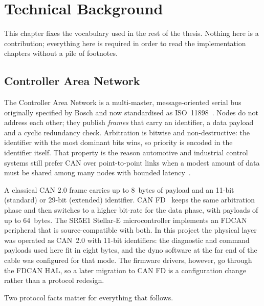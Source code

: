 \chapter{Technical Background}
\label{ch:bg}

This chapter fixes the vocabulary used in the rest of the thesis. Nothing
here is a contribution; everything here is required in order to read the
implementation chapters without a pile of footnotes.

\section{Controller Area Network}
\label{sec:can}

The Controller Area Network is a multi-master, message-oriented serial bus
originally specified by Bosch and now standardised as
ISO~11898~\cite{bosch1991can,iso11898,voss2008can}. Nodes do not address
each other; they publish \emph{frames} that carry an identifier, a data
payload and a cyclic redundancy check. Arbitration is bitwise and
non-destructive: the identifier with the most dominant bits wins, so
priority is encoded in the identifier itself. That property is the reason
automotive and industrial control systems still prefer CAN over
point-to-point links when a modest amount of data must be shared among many
nodes with bounded latency~\cite{navet2005can}.

A classical CAN 2.0 frame carries up to 8~bytes of payload and an 11-bit
(standard) or 29-bit (extended) identifier. CAN FD~\cite{iso11898fd} keeps
the same arbitration phase and then switches to a higher bit-rate for the
data phase, with payloads of up to 64~bytes. The SR5E1 Stellar-E
microcontroller implements an FDCAN peripheral that is source-compatible
with both. In this project the physical layer was operated as CAN~2.0 with
11-bit identifiers: the diagnostic and command payloads used here fit in
eight bytes, and the dyno software at the far end of the cable was
configured for that mode. The firmware drivers, however, go through the
FDCAN HAL, so a later migration to CAN FD is a configuration change rather
than a protocol redesign.

Two protocol facts matter for everything that follows.

